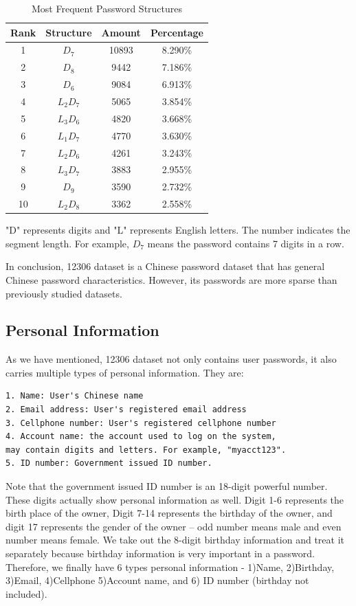 \documentclass{sig-alternate}
\begin{document}
\begin{table}
\label{t2}
\centering
\caption{Most Frequent Password Structures}
\begin{tabular}{|c|c|c|c|} \hline
Rank&Structure&Amount&Percentage\\ \hline
1&$D_7$&10893&8.290\%\\ 
2&$D_8$&9442&7.186\%\\ 
3&$D_6$&9084&6.913\%\\ 
4&$L_2D_7$&5065&3.854\%\\ 
5&$L_3D_6$&4820&3.668\%\\ 
6&$L_1D_7$&4770&3.630\%\\ 
7&$L_2D_6$&4261&3.243\%\\ 
8&$L_3D_7$&3883&2.955\%\\ 
9&$D_9$&3590&2.732\%\\ 
10&$L_2D_8$&3362&2.558\%\\ 
\hline\end{tabular}
\begin{tablenotes}
      \small
      \item "D" represents digits and "L" represents English letters. The number indicates the segment length. For example, $D_7$ means the password contains 7 digits in a row.
    \end{tablenotes}
\end{table}

In conclusion, 12306 dataset is a Chinese password dataset that has general Chinese password characteristics. However, its passwords are more sparse than previously studied datasets. 

\subsection{Personal Information}
As we have mentioned, 12306 dataset not only contains user passwords, it also carries multiple types of personal information. They are:

\begin{verbatim}
1. Name: User's Chinese name
2. Email address: User's registered email address
3. Cellphone number: User's registered cellphone number
4. Account name: the account used to log on the system, 
may contain digits and letters. For example, "myacct123".
5. ID number: Government issued ID number.
\end{verbatim}

Note that the government issued ID number is an 18-digit powerful number. These digits actually show personal information as well. Digit 1-6 represents the birth place of the owner, Digit 7-14 represents the birthday of the owner, and digit 17 represents the gender of the owner -- odd number means male and even number means female. We take out the 8-digit birthday information and treat it separately because birthday information is very important in a password. Therefore, we finally have 6 types personal information - 1)Name, 2)Birthday, 3)Email, 4)Cellphone 5)Account name, and 6) ID number (birthday not included). 
\end{document}
